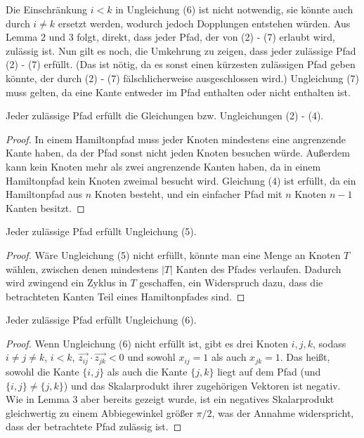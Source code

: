 \documentclass[a4paper, 10pt, ngerman]{article}
\begin{document}
Die Einschränkung $i < k$ in Ungleichung (6) ist nicht notwendig, sie könnte auch durch $i \ne k$ ersetzt werden, wodurch jedoch Dopplungen entstehen würden. Aus Lemma 2 und 3 folgt, direkt, dass jeder Pfad, der von (2) - (7) erlaubt wird, zulässig ist. Nun gilt es noch, die Umkehrung zu zeigen, dass jeder zulässige Pfad (2) - (7) erfüllt. (Das ist nötig, da es sonst einen kürzesten zulässigen Pfad geben könnte, der durch (2) - (7) fälschlicherweise ausgeschlossen wird.) Ungleichung (7) muss gelten, da eine Kante entweder im Pfad enthalten oder nicht enthalten ist.

\begin{lemma}
    Jeder zulässige Pfad erfüllt die Gleichungen bzw. Ungleichungen (2) - (4).
\end{lemma}

\begin{proof}
    In einem Hamiltonpfad muss jeder Knoten mindestens eine angrenzende Kante haben, da der Pfad sonst nicht jeden Knoten besuchen würde. Außerdem kann kein Knoten mehr als zwei angrenzende Kanten haben, da in einem Hamiltonpfad kein Knoten zweimal besucht wird. Gleichung (4) ist erfüllt, da ein Hamiltonpfad aus $n$ Knoten besteht, und ein einfacher Pfad mit $n$ Knoten $n - 1$ Kanten besitzt.
\end{proof}

\begin{lemma}
    Jeder zulässige Pfad erfüllt Ungleichung (5).
\end{lemma}

\begin{proof}
    Wäre Ungleichung (5) nicht erfüllt, könnte man eine Menge an Knoten $T$ wählen, zwischen denen mindestens $|T|$ Kanten des Pfades verlaufen. Dadurch wird zwingend ein Zyklus in $T$ geschaffen, ein Widerspruch dazu, dass die betrachteten Kanten Teil eines Hamiltonpfades sind.
\end{proof}

\begin{lemma}
    Jeder zulässige Pfad erfüllt Ungleichung (6).
\end{lemma}

\begin{proof}
    Wenn Ungleichung (6) nicht erfüllt ist, gibt es drei Knoten $i, j, k$, sodass $i \ne j \ne k$, $i < k$, $\vec{z_{ij}} \cdot \vec{z_{jk}} < 0$ und sowohl $x_{ij} = 1$ als auch $x_{jk} = 1$. Das heißt, sowohl die Kante $\{i, j\}$ als auch die Kante $\{j, k\}$ liegt auf dem Pfad (und $\{i, j\} \ne \{j, k\}$) und das Skalarprodukt ihrer zugehörigen Vektoren ist negativ. Wie in Lemma 3 aber bereits gezeigt wurde, ist ein negatives Skalarprodukt gleichwertig zu einem Abbiegewinkel größer $\pi / 2$, was der Annahme widerspricht, dass der betrachtete Pfad zulässig ist.
\end{proof}
\end{document}
